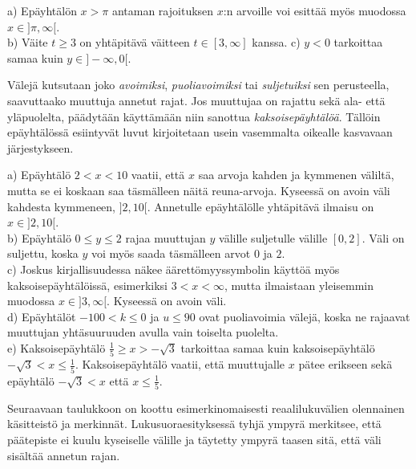 \begin{esimerkki}
a) Epäyhtälön $x>\pi$ antaman rajoituksen $x$:n arvoille voi esittää myös muodossa $x \in ]\pi, \infty [$. \\
b) Väite $t \geq 3$ on yhtäpitävä väitteen $t \in [3, \infty]$ kanssa.
c) $y<0$ tarkoittaa samaa kuin $y \in ]-\infty,0[$.
\end{esimerkki}

Välejä kutsutaan joko \emph{avoimiksi}, \emph{puoliavoimiksi} tai \emph{suljetuiksi} sen perusteella, saavuttaako muuttuja annetut rajat. Jos muuttujaa on rajattu sekä ala- että yläpuolelta, päädytään käyttämään niin sanottua \emph{kaksoisepäyhtälöä}. Tällöin epäyhtälössä esiintyvät luvut kirjoitetaan usein vasemmalta oikealle kasvavaan järjestykseen.

\begin{esimerkki}

a) Epäyhtälö $2<x<10$ vaatii, että $x$ saa arvoja kahden ja kymmenen väliltä, mutta se ei koskaan saa täsmälleen näitä reuna-arvoja. Kyseessä on avoin väli kahdesta kymmeneen, $]2,10[$. Annetulle epäyhtälölle yhtäpitävä ilmaisu on $x \in ]2,10[$. \\
b) Epäyhtälö $0\leq y \leq 2$ rajaa muuttujan $y$ välille suljetulle välille $[0,2]$. Väli on suljettu, koska $y$ voi myös saada täsmälleen arvot $0$ ja $2$. \\
c) Joskus kirjallisuudessa näkee äärettömyyssymbolin käyttöä myös kaksoisepäyhtälöissä, esimerkiksi $3<x<\infty $, mutta ilmaistaan yleisemmin muodossa $x \in ]3,\infty[$. Kyseessä on avoin väli. \\
d) Epäyhtälöt $-100<k\leq 0$ ja $u\leq 90$ ovat puoliavoimia välejä, koska ne rajaavat muuttujan yhtäsuuruuden avulla vain toiselta puolelta. \\
e) Kaksoisepäyhtälö $\frac{1}{5}\geq x>-\sqrt{3}$ tarkoittaa samaa kuin kaksoisepäyhtälö $-\sqrt{3}<x\leq \frac{1}{5}$. Kaksoisepäyhtälö vaatii, että muuttujalle $x$ pätee erikseen sekä epäyhtälö $-\sqrt{3}<x$ että $x\leq \frac{1}{5}$.
\end{esimerkki}

Seuraavaan taulukkoon on koottu esimerkinomaisesti reaalilukuvälien olennainen käsitteistö ja merkinnät. Lukusuoraesityksessä tyhjä ympyrä merkitsee, että päätepiste ei kuulu kyseiselle välille ja täytetty ympyrä taasen sitä, että väli sisältää annetun rajan.

